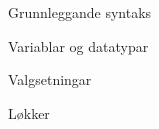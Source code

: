 
\begin{frame}{Grunnleggande syntaks}
  
\end{frame}

\begin{frame}{Variablar og datatypar}
  
\end{frame}

\begin{frame}{Valgsetningar}
  
\end{frame}

\begin{frame}{Løkker}
  
\end{frame}